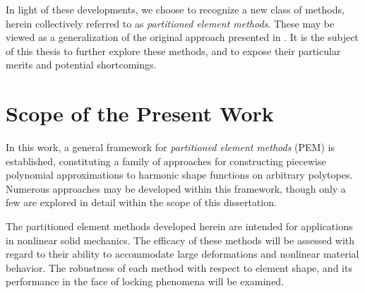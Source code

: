 	In light of these developments, we choose to recognize a new class of methods, herein collectively referred to as \textit{partitioned element methods}. These may be viewed as a generalization of the original approach presented in \cite{Rashid:12}. It is the subject of this thesis to further explore these methods, and to expose their particular merits and potential shortcomings.

\section{Scope of the Present Work}

	In this work, a general framework for \textit{partitioned element methods} (PEM) is established, constituting a family of approaches for constructing piecewise polynomial approximations to harmonic shape functions on arbitrary polytopes. Numerous approaches may be developed within this framework, though only a few are explored in detail within the scope of this dissertation.
	
	 The partitioned element methods developed herein are intended for applications in nonlinear solid mechanics. The efficacy of these methods will be assessed with regard to their ability to accommodate large deformations and nonlinear material behavior. The robustness of each method with respect to element shape, and its performance in the face of locking phenomena will be examined.
	 

